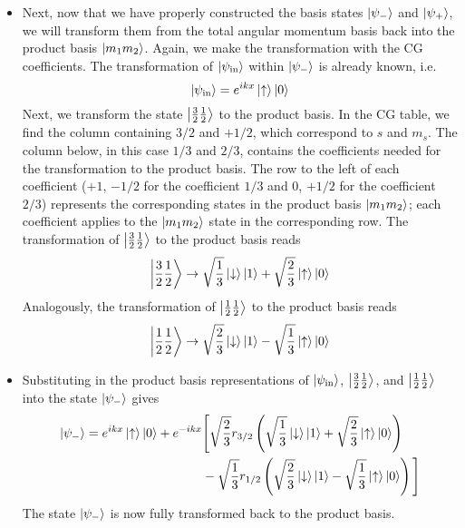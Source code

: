 \documentclass[11pt, a4paper]{article}
\newcommand{\p}{\psi}  %
\newcommand{\ua}{\uparrow}  %
\newcommand{\da}{\downarrow}  %
\begin{document}
\begin{itemize}
	\item Next, now that we have properly constructed the basis states $ \ket{\p_{-}} $ and $ \ket{\p_{+}} $, we will transform them from the total angular momentum basis back into the product basis $ \ket{m_{1}m_{2}} $. Again, we make the transformation with the CG coefficients. The transformation of $ \ket{\p_{\text{in}}} $ within $ \ket{\p_{-}} $ is already known, i.e.
	\begin{equation*}
		\ket{\p_{\text{in}}} = e^{ikx}\ket{\ua}\ket{0}
	\end{equation*}
	Next, we transform the state $ \ket{\frac{3}{2}\frac{1}{2}} $ to the product basis. In the CG table, we find the column containing $ 3/2 $ and $ +1/2 $, which correspond to $ s $ and $ m_{s} $. The column below, in this case $ 1/3 $ and $ 2/3 $, contains the coefficients needed for the transformation to the product basis. The row to the left of each coefficient ($ +1 $, $ -1/2 $ for the coefficient $ 1/3 $ and $ 0 $, $ +1/2 $ for the coefficient $ 2/3 $) represents the corresponding states in the product basis $ \ket{m_{1}m_{2}} $; each coefficient applies to the $ \ket{m_{1}m_{2}} $ state in the corresponding row. The transformation of $ \ket{\frac{3}{2}\frac{1}{2}} $ to the product basis reads
	\begin{equation*}
		\ket{\frac{3}{2}\frac{1}{2}}  \to \sqrt{\frac{1}{3}}\ket{\da}\ket{1} +  \sqrt{\frac{2}{3}}\ket{\ua}\ket{0} 
	\end{equation*}
	Analogously, the transformation of $ \ket{\frac{1}{2}\frac{1}{2}} $ to the product basis reads
	\begin{equation*}
		\ket{\frac{1}{2}\frac{1}{2}}  \to \sqrt{\frac{2}{3}}\ket{\da}\ket{1} - \sqrt{\frac{1}{3}}\ket{\ua}\ket{0} 
	\end{equation*}
	
	\item Substituting in the product basis representations of $ \ket{\psi_{\text{in}}} $, $ \ket{\frac{3}{2}\frac{1}{2}} $, and $ \ket{\frac{1}{2}\frac{1}{2}} $ into the state $ \ket{\psi_{-}} $ gives
	\begin{align*}
		\ket{\psi_{-}} = e^{ikx}\ket{\ua}\ket{0} + e^{-ikx} & \Bigg[\sqrt{\frac{2}{3}}r_{3/2}\left(\sqrt{\frac{1}{3}}\ket{\da}\ket{1} +  \sqrt{\frac{2}{3}}\ket{\ua}\ket{0}\right) \\
		& - \sqrt{\frac{1}{3}}r_{1/2}\left( \sqrt{\frac{2}{3}}\ket{\da}\ket{1} - \sqrt{\frac{1}{3}}\ket{\ua}\ket{0} \right)\Bigg]
	\end{align*}
	The state $ \ket{\psi_{-}}  $ is now fully transformed back to the product basis. 
	

\end{itemize}
\end{document}
